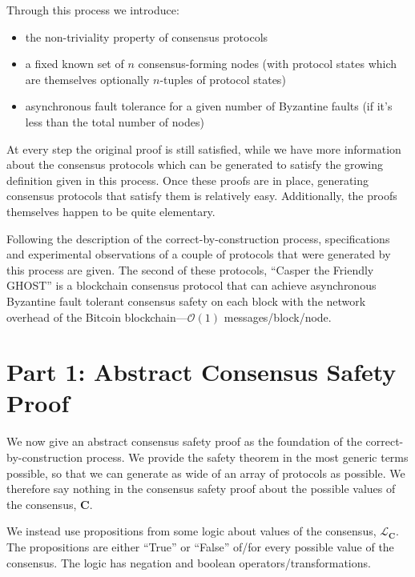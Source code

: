 \documentclass{article}
\theoremstyle{definition}
\newcommand{\cat}{
	\mathbf
}
\begin{document}
Through this process we introduce:

\begin{itemize}
\item the non-triviality property of consensus protocols
\item a fixed known set of $n$ consensus-forming nodes (with protocol states which are themselves optionally $n$-tuples of protocol states)
\item asynchronous fault tolerance for a given number of Byzantine faults (if it's less than the total number of nodes)
\end{itemize}

At every step the original proof is still satisfied, while we have more information about the consensus protocols which can be generated to satisfy the growing definition given in this process. Once these proofs are in place, generating consensus protocols that satisfy them is relatively easy. Additionally, the proofs themselves happen to be quite elementary.

Following the description of the correct-by-construction process, specifications and experimental observations of a couple of protocols that were generated by this process are given. The second of these protocols, ``Casper the Friendly GHOST'' is a blockchain consensus protocol that can achieve asynchronous Byzantine fault tolerant consensus safety on each block with the network overhead of the Bitcoin blockchain---$\mathcal{O}(1)$ messages/block/node.

\section{Part 1: Abstract Consensus Safety Proof}

We now give an abstract consensus safety proof as the foundation of the correct-by-construction process. We provide the safety theorem in the most generic terms possible, so that we can generate as wide of an array of protocols as possible. We therefore say nothing in the consensus safety proof about the possible values of the consensus, $\cat{C}$.

We instead use propositions from some logic about values of the consensus, $\mathcal{L}_\cat{C}$. The propositions are either ``True'' or ``False'' of/for every possible value of the consensus. The logic has negation and boolean operators/transformations.
\end{document}

